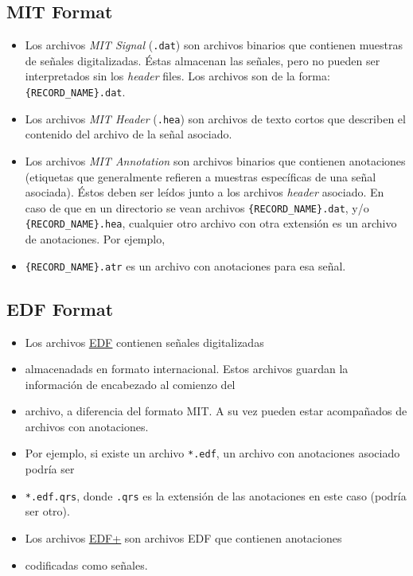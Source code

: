 \subsection*{MIT Format}
\begin{itemize}
  \item Los archivos \textit{MIT Signal} (\texttt{.dat}) son archivos binarios que contienen muestras de señales
  digitalizadas. Éstas almacenan las señales, pero no pueden ser interpretados sin los \textit{header} files.
  Los archivos son de la forma: \texttt{\{RECORD\_NAME\}.dat}.
  \item Los archivos \textit{MIT Header} (\texttt{.hea}) son archivos de texto cortos que describen el contenido
  del archivo de la señal asociado.
  \item Los archivos \textit{MIT Annotation} son archivos binarios que contienen anotaciones (etiquetas que
  generalmente refieren a muestras específicas de una señal asociada). Éstos deben ser leídos junto a los archivos
  \textit{header} asociado. En caso de que en un directorio se vean archivos \texttt{\{RECORD\_NAME\}.dat}, y/o
  \texttt{\{RECORD\_NAME\}.hea}, cualquier otro archivo con otra extensión es un archivo de anotaciones. Por ejemplo,
  \item \texttt{\{RECORD\_NAME\}.atr} es un archivo con anotaciones para esa señal.
\end{itemize}

\subsection*{EDF Format}
\begin{itemize}
  \item Los archivos \href{http://www.edfplus.info/specs/edf.html}{\underline{EDF}} contienen señales digitalizadas
  \item almacenadads en formato internacional. Estos archivos guardan la información de encabezado al comienzo del
  \item archivo, a diferencia del formato MIT. A su vez pueden estar acompañados de archivos con anotaciones.
  \item Por ejemplo, si existe un archivo \texttt{*.edf}, un archivo con anotaciones asociado podría ser
  \item \texttt{*.edf.qrs}, donde \texttt{.qrs} es la extensión de las anotaciones en este caso (podría ser otro).
  \item Los archivos
  \href{http://www.edfplus.info/specs/edfplus.html}{\underline{EDF+}} son archivos EDF que contienen anotaciones
  \item codificadas como señales.
\end{itemize}

